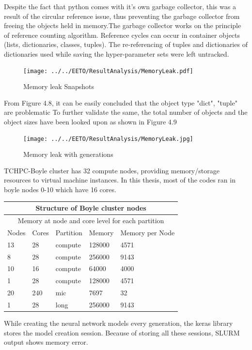 Despite the fact that python comes with it's own garbage collector, this was a result of the circular reference issue, thus preventing the garbage collector from freeing the objects held in memory.The garbage collector works on the principle of reference counting algorithm.
Reference cycles can occur in container objects (lists, dictionaries, classes, tuples). The re-referencing of tuples and dictionaries of dictionaries used while saving the hyper-parameter sets were left untracked. 

\begin{figure}
	\texttt{[image: ../../EETO/ResultAnalysis/MemoryLeak.pdf]}
	\caption{Memory leak Snapshots}
\end{figure}

From Figure 4.8, it can be easily concluded that the object type "dict", "tuple" are problematic
To further validate the same, the total number of objects and the object sizes have been looked upon as shown in Figure 4.9

\begin{figure}
	\texttt{[image: ../../EETO/ResultAnalysis/MemoryLeak.jpg]}
	\caption{Memory leak with generations}
\end{figure}



TCHPC-Boyle cluster has 32 compute nodes, providing memory/storage resources to virtual machine instances. In this thesis, most of the codes ran in boyle nodes 0-10 which have 16 cores.


\begin{tabular}{|p{3cm}||p{3cm}|p{3cm}|p{3cm}|p{3cm}| }
	\hline
	\multicolumn{5}{|c|}{Structure of Boyle cluster nodes} \\
	\hline
	\multicolumn{5}{|c|}{Memory at node and core level for each partition} \\
	\hline
	Nodes & Cores & Partition & Memory & Memory per Node\\
	\hline
	13&28&compute&128000&4571\\
	8&28&compute&256000&9143\\
	10&16&compute&64000&4000\\
	1&28&compute&128000&4571\\
	20&240&mic&7697&32\\
	1&28&long&256000&9143\\
	\hline
\end{tabular}


While creating the neural network models every generation, the keras library stores the model creation session. Because of storing all these sessions, SLURM output shows memory error. 



